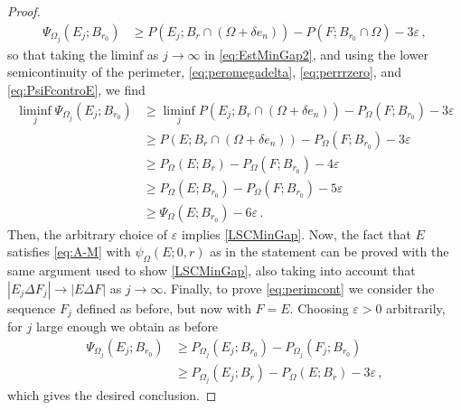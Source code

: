 \documentclass[a4paper,reqno,11pt]{amsart}
\newcommand{\e}{\varepsilon}
\newcommand{\difsim}{\Delta}
\newcommand{\pr}{P_{\Omega}}
\newcommand{\p}{P}
\begin{document}
\begin{proof}
\begin{align} \label{eq:EstMinGap2}
\Psi_{\Omega_{j}}(E_{j};B_{r_{0}}) & \ge \p(E_{j};B_{r} \cap (\Omega+\delta e_{n})) - \p(F;B_{r_{0}} \cap \Omega) -3\e\,,
\end{align}
so that taking the liminf as $j\to\infty$ in \eqref{eq:EstMinGap2}, and using the lower semicontinuity of the perimeter, \eqref{eq:peromegadelta}, \eqref{eq:perrrzero}, and \eqref{eq:PsiFcontroE}, we find
\begin{align*}
\liminf_{j} \Psi_{\Omega_{j}}(E_{j};B_{r_{0}}) &\ge \liminf_{j} \p(E_{j};B_{r} \cap (\Omega+\delta e_{n})) - \pr(F;B_{r_{0}}) -3\e\\
&\ge \p(E;B_{r} \cap (\Omega+\delta e_{n})) - \pr(F;B_{r_{0}}) -3\e\\
&\ge \pr(E;B_{r}) - \pr(F;B_{r_{0}}) -4\e\\
&\ge \pr(E;B_{r_{0}}) - \pr(F;B_{r_{0}}) -5\e\\
&\ge \Psi_{\Omega}(E;B_{r_{0}}) - 6\e\,.
\end{align*}
Then, the arbitrary choice of $\e$ implies \eqref{LSCMinGap}. Now, the fact that $E$ satisfies \eqref{eq:A-M} with $\psi_{\Omega}(E;0,r)$ as in the statement can be proved with the same argument used to show \eqref{LSCMinGap}, also taking into account that $|E_{j}\difsim F_{j}|\to |E\difsim F|$ as $j\to\infty$. Finally, to prove \eqref{eq:perimcont} we consider the sequence $F_{j}$ defined as before, but now with $F=E$. Choosing $\e>0$ arbitrarily, for $j$ large enough we obtain as before
\begin{align*}
\Psi_{\Omega_{j}}(E_{j};B_{r_{0}}) &\ge \p_{\Omega_{j}}(E_{j};B_{r_{0}}) - \p_{\Omega_{j}}(F_{j};B_{r_{0}})\\
&\ge \p_{\Omega_{j}}(E_{j};B_{r}) - \pr(E;B_{r}) - 3\e\,,
\end{align*}
which gives the desired conclusion.
\end{proof}
\end{document}
